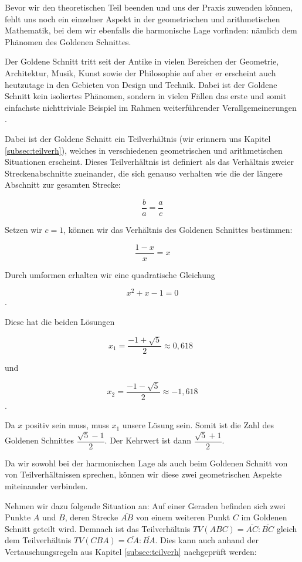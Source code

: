 \documentclass[12pt,a4paper]{article}
\begin{document}
Bevor wir den theoretischen Teil beenden und uns der Praxis zuwenden können, fehlt uns noch ein einzelner Aspekt in der geometrischen und arithmetischen Mathematik, bei dem wir ebenfalls die harmonische Lage vorfinden: nämlich dem Phänomen des Goldenen Schnittes.

Der Goldene Schnitt tritt seit der Antike in  vielen Bereichen der Geometrie, Architektur, Musik, Kunst sowie der Philosophie auf aber er erscheint auch heutzutage in den Gebieten von Design und Technik. Dabei ist der Goldene Schnitt kein isoliertes Phänomen, sondern in vielen Fällen das erste und somit einfachste nichttriviale Beispiel im Rahmen weiterführender Verallgemeinerungen \citep[s.][S.~5]{goldenerSchnitt}.

Dabei ist der Goldene Schnitt ein Teilverhältnis (wir erinnern uns Kapitel \ref{subsec:teilverh}), welches in verschiedenen geometrischen und arithmetischen Situationen erscheint. Dieses Teilverhältnis ist definiert als das Verhältnis zweier Streckenabschnitte zueinander, die sich genauso verhalten wie die der längere Abschnitt zur gesamten Strecke:

\[\dfrac{b}{a} = \dfrac{a}{c}\]

Setzen wir $c = 1$, können wir das Verhältnis des Goldenen Schnittes bestimmen:

\[\dfrac{1-x}{x} = x\]

Durch umformen erhalten wir eine quadratische Gleichung

\[x^2 + x - 1 = 0\].

Diese hat die beiden Lösungen

\[x_1 = \dfrac{-1 + \sqrt{5}}{2} \approx 0,618~~ \]

und

\[ x_2 = \dfrac{-1 - \sqrt{5}}{2} \approx -1,618 \].

Da $x$ positiv sein muss, muss $x_1$ unsere Lösung sein. Somit ist die Zahl des Goldenen Schnittes $\dfrac{\sqrt{5}-1}{2}$. Der Kehrwert ist dann $\dfrac{\sqrt{5}+1}{2}$.

Da wir sowohl bei der harmonischen Lage als auch beim Goldenen Schnitt von von Teilverhältnissen sprechen, können wir diese zwei geometrischen Aspekte miteinander verbinden.

Nehmen wir dazu folgende Situation an: Auf einer Geraden befinden sich zwei Punkte $A$ und $B$, deren Strecke $\overline{A B}$ von einem weiteren Punkt $C$ im Goldenen Schnitt geteilt wird. Demnach ist das Teilverhältnis $TV(A B C) = \overline{A C} : \overline{B C}$ gleich dem Teilverhältnis $TV(C B A) = \overline{C A} : \overline{B A}$. Dies kann auch anhand der Vertauschungsregeln aus Kapitel \ref{subsec:teilverh} nachgeprüft werden:
\end{document}
